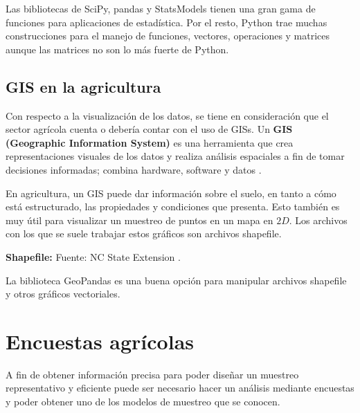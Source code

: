 \documentclass{report}
\begin{document}
Las bibliotecas de SciPy, pandas y StatsModels tienen una gran gama de funciones para aplicaciones de estadística. Por el resto, Python trae muchas construcciones para el manejo de funciones, vectores, operaciones y matrices aunque las matrices no son lo más fuerte de Python.

\subsection{GIS en la agricultura}

Con respecto a la visualización de los datos, se tiene en consideración que el sector agrícola cuenta o debería contar con el uso de GISs. Un \textbf{GIS (Geographic Information System)} es una herramienta que crea representaciones visuales de los datos y realiza análisis espaciales a fin de tomar decisiones informadas; combina hardware, software y datos \cite{hammonds-2019}.

\bigbreak

En agricultura, un GIS puede dar información sobre el suelo, en tanto a cómo está estructurado, las propiedades y condiciones que presenta. Esto también es muy útil para visualizar un muestreo de puntos en un mapa en $2D$. Los archivos con los que se suele trabajar estos gráficos son archivos shapefile.

\bigbreak

\textbf{Shapefile:}  Fuente: NC State Extension \cite{nc-state-extension-2021}.

\bigbreak

La biblioteca GeoPandas es una buena opción para manipular archivos shapefile y otros gráficos vectoriales.

\section{Encuestas agrícolas}

A fin de obtener información precisa para poder diseñar un muestreo representativo y eficiente puede ser necesario hacer un análisis mediante encuestas y poder obtener uno de los modelos de muestreo que se conocen.

\bigbreak
\end{document}
